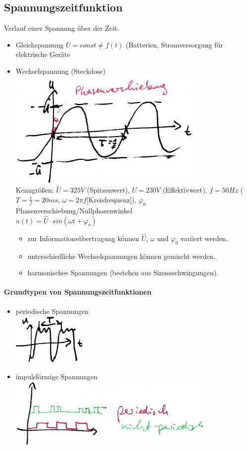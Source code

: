 \subsection{Spannungszeitfunktion}
Verlauf einer Spannung über der Zeit.
\begin{itemize}
\item Gleichspannung $U= const \not = f(t)$ (Batterien, Stromversorgung für elektrische Geräte
\item Wechselspannung (Steckdose)\\
\includegraphics[scale=.75]{Abbildungen/ABB403}\\
Kenngrößen: $\hat{U}=325V$ (Spitzenwert), $U=230V$ (Effektivwert), $f=50Hz$ ($T=\frac{1}{f}=20ms$, $\omega = 2 \pi f$[Kreisfrequenz]), $\varphi_0$ Phasenverschiebung/Nullphasenwinkel\\
$u(t)=\hat{U}\cdot sin(\omega t+\varphi_o)$
\begin{itemize}
\item zur Informationsübertragung können $\hat{U}$, $\omega$ und $\varphi_0$ variiert werden.
\item unterschiedliche Wechselspannungen können gemischt werden.
\item harmonischee Spannungen (bestehen aus Sinussschwingungen).
\end{itemize}
\end{itemize}

\paragraph{Grundtypen von Spannungszeitfunktionen}
\begin{itemize}
\item periodische Spannungen\\
\includegraphics[scale=.75]{Abbildungen/ABB404}
\item impulsförmige Spannungen\\
\includegraphics[scale=.75]{Abbildungen/ABB405}
\end{itemize}

